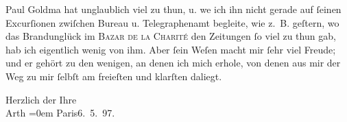 \pstart
           Paul Goldma{\geminationn} hat unglaublich viel zu thun, u. we{\geminationn} ich ihn nicht
               gerade auf{ }ſeinen Excurſionen zwiſchen Bureau u. Telegraphenamt begleite, wie z. B.
               geſtern, wo das Brandunglück im \textsc{Bazar de la Charité} den Zeitungen{ }ſo {\pb}viel zu thun gab, hab ich
               eigentlich wenig von ihm. Aber{ }ſein Weſen macht mir{ }ſehr viel Freude; und er gehört
               zu den wenigen, an denen ich mich erhole, von denen aus mir der Weg zu mir{ }ſelbſt am
               freieſten und klarſten daliegt.\pend
           
\pstart
           Herzlich der Ihre{\\[\baselineskip]}\spacefill\mbox{Arth}\pend
           \leftskip=0em{}
\pstart
           Paris6. 5. 97.\pend
           \endnumbering{}  \newcommand{\dateiname}{L00674}\newcommand{\titel}{Arthur Schnitzler an Hugo von Hofmannsthal, 6. 5. 1897}\newcommand{\editorInnen}{Martin Anton Müller und Gerd-Hermann Susen}
